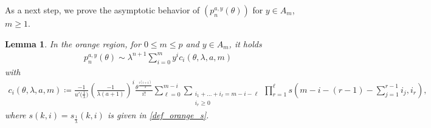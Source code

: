 \documentclass[12pt]{article}
\newcommand{\1}{\mathds{1}}
\theoremstyle{definition}
\theoremstyle{plain}
\newtheorem{Lemma}[definition]{Lemma}
\theoremstyle{remark}
\newtheorem{Remark}{Remark}
\begin{document}
As a next step, we prove the asymptotic behavior of $(p_n^{a,y}(\theta))$ for $y\in A_m$, $m\ge 1$.

\begin{Lemma}\label{orange_asymptotic_first}
    In the orange region, for $0\leq m\leq p$ and $y\in A_m$, it holds
    \begin{align*}
        p_n^{a,y}(\theta)\sim \lambda^{n+1}\sum_{i=0}^my^ic_i(\theta,\lambda,a, m)
    \end{align*}
    with \begin{align*}
        c_i(\theta,\lambda,a,m)\coloneqq\frac{-1}{u'\big(\frac{1}{\lambda}\big)}\left(\frac{-1}{\lambda(a+1)}\right)^i\frac{\theta^\frac{i(i+1)}{2}}{i!}\sum_{{\ell}=0}^{m-i}\sum_{\substack{i_1+\dots +i_{\ell}= m-i-{\ell}\\i_r\ge 0}}\prod_{r=1}^{\ell}s(m\!-\!i\!-\!(r\!-\!1)\!-\!\sum_{j=1}^{r-1}i_j,i_r),
    \end{align*}
    where $s(k,i)=s_{\frac{1}{\lambda}}(k,i)$ is given in \eqref{def_orange_s}.
\end{Lemma}
\end{document}
